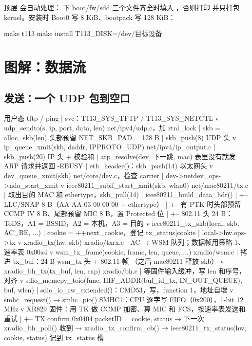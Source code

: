 顶层  会自动处理： 下 boot/fw/sdd 三个文件齐全时填入 ，否则打印  并只打包 kernel。安装时 Boot0 写 8 KiB、bootpack 写 128 KiB：

\begin{shcode}
make t113
make install T113_DISK=/dev/目标设备
\end{shcode}

\section{图解：数据流}

\subsection{发送：一个 UDP 包到空口}

\begin{txtcode}
用户态 tftp / ping
  | svc：T113_SYS_TFTP / T113_SYS_NETCTL
  v
udp_sendto(s, ip, port, data, len)            net/ipv4/udp.c，加 rtnl_lock
  | skb = alloc_skb(len)                       头部预留 NET_SKB_PAD = 128 B
  | skb_push(8)                                UDP 头
  v
ip_queue_xmit(skb, daddr, IPPROTO_UDP)        net/ipv4/ip_output.c
  | skb_push(20)                               IP 头 + 校验和
  | arp_resolve(dev, 下一跳, mac)              表里没有就发 ARP 请求并返回 -EBUSY
  | eth_header()：skb_push(14)                 以太网头
  v
dev_queue_xmit(skb)                           net/core/dev.c，检查 carrier
  | dev->netdev_ops->ndo_start_xmit
  v
ieee80211_subif_start_xmit(skb, wlan0)        net/mac80211/tx.c
  | 取出目的 MAC 和 ethertype，skb_pull(14)
  | ieee80211_build_data_hdr()
  |   +-- LLC/SNAP 8 B（AA AA 03 00 00 00 + ethertype）
  |   +-- 有 PTK 时头部预留 CCMP IV 8 B、尾部预留 MIC 8 B，置 Protected 位
  |   +-- 802.11 头 24 B：ToDS，A1 = BSSID，A2 = 本机，A3 = 目的
  v
ieee80211_tx_skb(local, skb, AC_BE, ...)
  | cookie = ++next_cookie，登记 tx_status[cookie %
  | local->hw.ops->tx
  v
xradio_tx(hw, skb)                            xradio/txrx.c
  | AC → WSM 队列；数据帧用策略 1、速率表 0x00a4
  v
wsm_tx_frame(cookie, frame, len, queue, ...)    xradio/wsm.c
  | 拷进 tx_buf：24 B wsm_tx 头 + 802.11 帧        （之后 mac80211 释放 skb）
  v
xradio_bh_tx(tx_buf, len, cap)                xradio/bh.c
  | 等固件输入缓冲，写 len 和序号，对齐
  v
sdio_memcpy_toio(func, HIF_ADDR(buf_id_tx, IN_OUT_QUEUE), buf, wlen)
  | sdio_io_rw_extended()：CMD53，写，function 1，地址自增
  v
smhc_request() → smhc_pio()                   SMHC1：CPU 逐字写 FIFO（0x200），1-bit 12 MHz
  v
XR829 固件：用 TK 做 CCMP 加密、算 MIC 和 FCS，按速率表发送和重试
  |
  +-- TX confirm 0x0404 {packetID = cookie, status}
        → 下一次 xradio_bh_poll() 收到 → xradio_tx_confirm_cb()
        → ieee80211_tx_status(hw, cookie, status)     记到 tx_status 槽
\end{txtcode}

